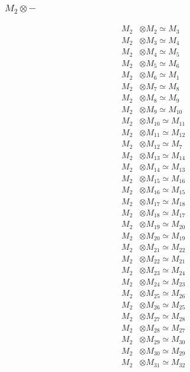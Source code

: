 \subsubsection{$ M_{2}\otimes -$}
\begin{align*}
M_{2} &\otimes M_{2} \simeq M_{3} \\
M_{2} &\otimes M_{3} \simeq M_{4} \\
M_{2} &\otimes M_{4} \simeq M_{5} \\
M_{2} &\otimes M_{5} \simeq M_{6} \\
M_{2} &\otimes M_{6} \simeq M_{1} \\
M_{2} &\otimes M_{7} \simeq M_{8} \\
M_{2} &\otimes M_{8} \simeq M_{9} \\
M_{2} &\otimes M_{9} \simeq M_{10} \\
M_{2} &\otimes M_{10} \simeq M_{11} \\
M_{2} &\otimes M_{11} \simeq M_{12} \\
M_{2} &\otimes M_{12} \simeq M_{7} \\
M_{2} &\otimes M_{13} \simeq M_{14} \\
M_{2} &\otimes M_{14} \simeq M_{13} \\
M_{2} &\otimes M_{15} \simeq M_{16} \\
M_{2} &\otimes M_{16} \simeq M_{15} \\
M_{2} &\otimes M_{17} \simeq M_{18} \\
M_{2} &\otimes M_{18} \simeq M_{17} \\
M_{2} &\otimes M_{19} \simeq M_{20} \\
M_{2} &\otimes M_{20} \simeq M_{19} \\
M_{2} &\otimes M_{21} \simeq M_{22} \\
M_{2} &\otimes M_{22} \simeq M_{21} \\
M_{2} &\otimes M_{23} \simeq M_{24} \\
M_{2} &\otimes M_{24} \simeq M_{23} \\
M_{2} &\otimes M_{25} \simeq M_{26} \\
M_{2} &\otimes M_{26} \simeq M_{25} \\
M_{2} &\otimes M_{27} \simeq M_{28} \\
M_{2} &\otimes M_{28} \simeq M_{27} \\
M_{2} &\otimes M_{29} \simeq M_{30} \\
M_{2} &\otimes M_{30} \simeq M_{29} \\
M_{2} &\otimes M_{31} \simeq M_{32} \\

\end{align*}
